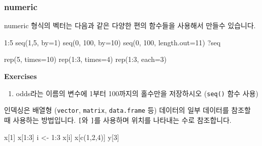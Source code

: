 \documentclass[
  a4paper,
]{book}
\newenvironment{Shaded}{\begin{snugshade}}{\end{snugshade}}
\newcommand{\AttributeTok}[1]{\textcolor[rgb]{0.40,0.45,0.13}{#1}}
\newcommand{\DecValTok}[1]{\textcolor[rgb]{0.68,0.00,0.00}{#1}}
\newcommand{\FunctionTok}[1]{\textcolor[rgb]{0.28,0.35,0.67}{#1}}
\newcommand{\NormalTok}[1]{\textcolor[rgb]{0.00,0.23,0.31}{#1}}
\newcommand{\OtherTok}[1]{\textcolor[rgb]{0.00,0.23,0.31}{#1}}
\newcommand{\SpecialCharTok}[1]{\textcolor[rgb]{0.37,0.37,0.37}{#1}}
\providecommand{\tightlist}{%
  \setlength{\itemsep}{0pt}\setlength{\parskip}{0pt}}\usepackage{longtable,booktabs,array}
\begin{document}
\hypertarget{numeric}{%
\subsubsection{numeric}\label{numeric}}

numeric 형식의 벡터는 다음과 같은 다양한 편의 함수들을 사용해서 만들수
있습니다.

\begin{Shaded}
\begin{Highlighting}[]
\DecValTok{1}\SpecialCharTok{:}\DecValTok{5}
\FunctionTok{seq}\NormalTok{(}\DecValTok{1}\NormalTok{,}\DecValTok{5}\NormalTok{, }\AttributeTok{by=}\DecValTok{1}\NormalTok{)}
\FunctionTok{seq}\NormalTok{(}\DecValTok{0}\NormalTok{, }\DecValTok{100}\NormalTok{, }\AttributeTok{by=}\DecValTok{10}\NormalTok{)}
\FunctionTok{seq}\NormalTok{(}\DecValTok{0}\NormalTok{, }\DecValTok{100}\NormalTok{, }\AttributeTok{length.out=}\DecValTok{11}\NormalTok{)}
\NormalTok{?seq}

\FunctionTok{rep}\NormalTok{(}\DecValTok{5}\NormalTok{, }\AttributeTok{times=}\DecValTok{10}\NormalTok{)}
\FunctionTok{rep}\NormalTok{(}\DecValTok{1}\SpecialCharTok{:}\DecValTok{3}\NormalTok{, }\AttributeTok{times=}\DecValTok{4}\NormalTok{)}
\FunctionTok{rep}\NormalTok{(}\DecValTok{1}\SpecialCharTok{:}\DecValTok{3}\NormalTok{, }\AttributeTok{each=}\DecValTok{3}\NormalTok{)}
\end{Highlighting}
\end{Shaded}

\textbf{Exercises}

\begin{enumerate}
\def\labelenumi{\arabic{enumi})}
\tightlist
\item
  odds라는 이름의 변수에 1부터 100까지의 홀수만을 저장하시오
  (\texttt{seq()} 함수 사용)
\end{enumerate}

인덱싱은 배열형 (\texttt{vector}, \texttt{matrix}, \texttt{data.frame}
등) 데이터의 일부 데이터를 참조할 때 사용하는 방법입니다. \texttt{{[}}와
\texttt{{]}}를 사용하며 위치를 나타내는 수로 참조합니다.

\begin{Shaded}
\begin{Highlighting}[]
\NormalTok{x[}\DecValTok{1}\NormalTok{]}
\NormalTok{x[}\DecValTok{1}\SpecialCharTok{:}\DecValTok{3}\NormalTok{]}
\NormalTok{i }\OtherTok{\textless{}{-}} \DecValTok{1}\SpecialCharTok{:}\DecValTok{3}
\NormalTok{x[i]}
\NormalTok{x[}\FunctionTok{c}\NormalTok{(}\DecValTok{1}\NormalTok{,}\DecValTok{2}\NormalTok{,}\DecValTok{4}\NormalTok{)]}
\NormalTok{y[}\DecValTok{3}\NormalTok{]}
\end{Highlighting}
\end{Shaded}
\end{document}
